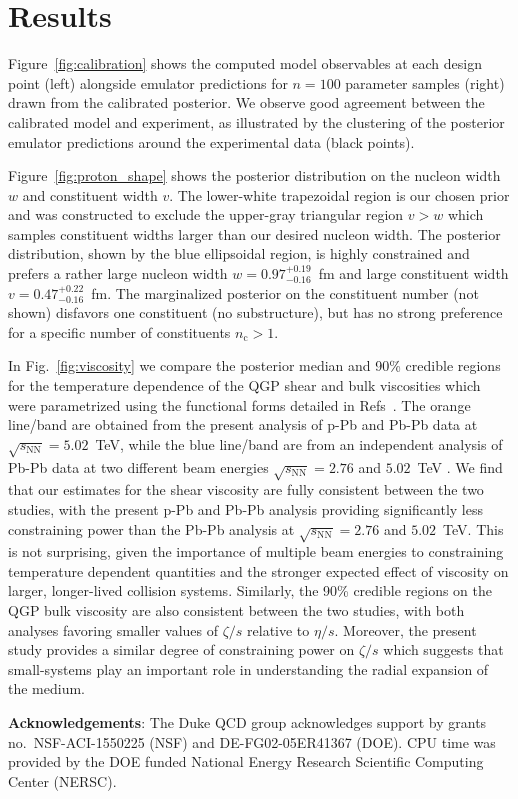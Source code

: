 \documentclass[3p,times,procedia,sort&compress]{elsarticle}
\newcommand{\sqrts}{\sqrt{s_\mathrm{NN}}}
\newcommand{\nc}{n_\mathrm{c}}
\begin{document}
\section{Results}

Figure~\ref{fig:calibration} shows the computed model observables at each design point (left) alongside emulator predictions for $n=100$ parameter samples (right) drawn from the calibrated posterior.
We observe good agreement between the calibrated model and experiment, as illustrated by the clustering of the posterior emulator predictions around the experimental data (black points).

Figure~\ref{fig:proton_shape} shows the posterior distribution on the nucleon width $w$ and constituent width $v$.
The lower-white trapezoidal region is our chosen prior and was constructed to exclude the upper-gray triangular region $v > w$ which samples constituent widths larger than our desired nucleon width.
The posterior distribution, shown by the blue ellipsoidal region, is highly constrained and prefers a rather large nucleon width $w=0.97_{-0.16}^{+0.19}$~fm and large constituent width $v=0.47_{-0.16}^{+0.22}$~fm.
The marginalized posterior on the constituent number (not shown) disfavors one constituent (no substructure), but has no strong preference for a specific number of constituents $\nc>1$.

In Fig.~\ref{fig:viscosity} we compare the posterior median and 90\% credible regions for the temperature dependence of the QGP shear and bulk viscosities which were parametrized using the functional forms detailed in Refs~\cite{Bass:2017zyn, Bernhard:2018hnz}.
The orange line/band are obtained from the present analysis of p-Pb and Pb-Pb data at $\sqrts=5.02$~TeV, while the blue line/band are from an independent analysis of Pb-Pb data at two different beam energies $\sqrts=2.76$ and $5.02$~TeV \cite{Bernhard:2018hnz}.
We find that our estimates for the shear viscosity are fully consistent between the two studies, with the present p-Pb and Pb-Pb analysis providing significantly less constraining power than the Pb-Pb analysis at $\sqrts=2.76$ and $5.02$~TeV.
This is not surprising, given the importance of multiple beam energies to constraining temperature dependent quantities and the stronger expected effect of viscosity on larger, longer-lived collision systems.
Similarly, the 90\% credible regions on the QGP bulk viscosity are also consistent between the two studies, with both analyses favoring smaller values of $\zeta/s$ relative to $\eta/s$.
Moreover, the present study provides a similar degree of constraining power on $\zeta/s$ which suggests that small-systems play an important role in understanding the radial expansion of the medium.

\vspace{.5em}\noindent\textbf{Acknowledgements}:
The Duke QCD group acknowledges support by grants no.\ NSF-ACI-1550225 (NSF) and DE-FG02-05ER41367 (DOE).
CPU time was provided by the DOE funded National Energy Research Scientific Computing Center (NERSC).



\end{document}
